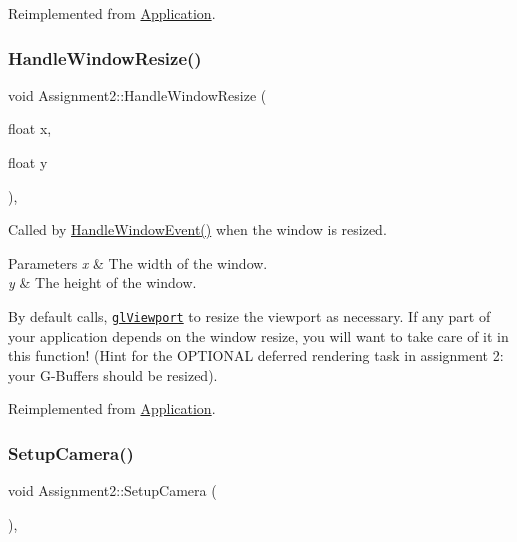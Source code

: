 Reimplemented from \hyperlink{class_application_ae6074c3f102de1cb2fe4c81b545679db}{Application}.

\hypertarget{class_assignment2_a1af734567de5e8e73a2fd726fe3914f2}{}\label{class_assignment2_a1af734567de5e8e73a2fd726fe3914f2}
\subsubsection{\texorpdfstring{Handle\+Window\+Resize()}{HandleWindowResize()}}
{\footnotesize\ttfamily void Assignment2\+::\+Handle\+Window\+Resize (\begin{DoxyParamCaption}\item[{float}]{x,  }\item[{float}]{y }\end{DoxyParamCaption})\hspace{0.3cm}{\ttfamily [protected]}, {\ttfamily [virtual]}}



Called by \hyperlink{class_application_a74d92db64e051efa56d0357989dcb755}{Handle\+Window\+Event()} when the window is resized.


\begin{DoxyParams}{Parameters}
{\em x} & The width of the window. \\
\hline
{\em y} & The height of the window.\\
\hline
\end{DoxyParams}
By default calls, \href{https://www.opengl.org/sdk/docs/man/html/glViewport.xhtml}{\tt gl\+Viewport} to resize the viewport as necessary. If any part of your application depends on the window resize, you will want to take care of it in this function! (Hint for the O\+P\+T\+I\+O\+N\+AL deferred rendering task in assignment 2\+: your \textquotesingle{}G-\/\+Buffers\textquotesingle{} should be resized).

Reimplemented from \hyperlink{class_application_abdba284a0f075ee1d4a2108c3a5236a2}{Application}.

\hypertarget{class_assignment2_ab9ace1ffdac8f7425c64d661f3d13acd}{}\label{class_assignment2_ab9ace1ffdac8f7425c64d661f3d13acd}
\subsubsection{\texorpdfstring{Setup\+Camera()}{SetupCamera()}}
{\footnotesize\ttfamily void Assignment2\+::\+Setup\+Camera (\begin{DoxyParamCaption}{ }\end{DoxyParamCaption})\hspace{0.3cm}{\ttfamily [private]}, {\ttfamily [virtual]}}



